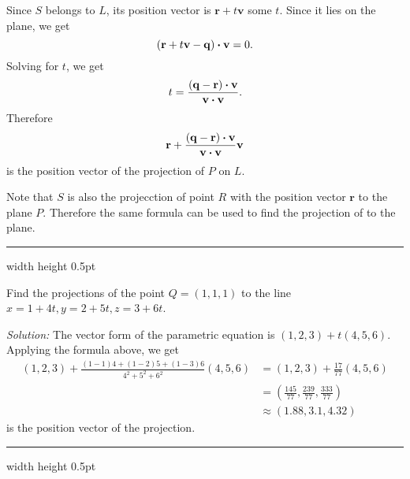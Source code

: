 Since $S$ belongs to $L$,
its position vector is  $\mathbf{r}+t\mathbf{v}$ some $t$.
Since it lies on the plane, we get
\[(\mathbf{r}+t\mathbf{v}-\mathbf{q}) \bm{\cdot} \mathbf{v}=0.\]
Solving for $t$, we get
\[t=\frac{(\mathbf{q}-\mathbf{r}) \bm{\cdot} \mathbf{v}}{\mathbf{v} \bm{\cdot} \mathbf{v}}.\]
Therefore 
\[\mathbf{r}+\frac{(\mathbf{q}-\mathbf{r}) \bm{\cdot} \mathbf{v}}{\mathbf{v} \bm{\cdot} \mathbf{v}}\mathbf{v}\]
is the position vector of the projection of $P$ on $L$.

Note that $S$ is also the projecction of point $R$ with the position vector $\mathbf{r}$ to the plane $P$.
Therefore the same formula can be used to find the projection of to the plane.

\hrule width \textwidth height 0.5pt
\smallskip
\begin{exmp}
\label{exmp:projection}
 Find the projections of the point $Q = (1,1,1)$ to the line $x=1+4t, y=2+5t, z=3+6t$.
 \smallskip
 \par\noindent\emph{Solution:} The vector form of the parametric equation is $(1,2,3)+t(4,5,6)$.
 Applying the formula above, we get
\begin{align*}
(1,2,3)+\frac{(1-1)4+(1-2)5+(1-3)6}{4^2+5^2+6^2}(4,5,6)
&=(1,2,3)+\frac{17}{77}(4,5,6)
\\
&=(\tfrac{145}{77},\tfrac{239}{77},\tfrac{333}{77})
\\
&\approx(1.88,3.1,4.32)
\end{align*}
is the position vector of the projection.
\end{exmp}
\hrule width \textwidth height 0.5pt

